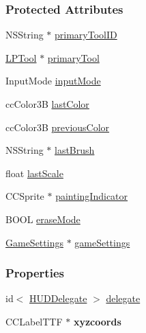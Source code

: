 \subsubsection*{Protected Attributes}
\begin{DoxyCompactItemize}
\item 
N\-S\-String $\ast$ \hyperlink{interface_h_u_d_layer_aae17304a5ecff2a6fa43471edb779341}{primary\-Tool\-I\-D}
\item 
\hyperlink{interface_l_p_tool}{L\-P\-Tool} $\ast$ \hyperlink{interface_h_u_d_layer_aad9b0e2b4164986e18ea0a9afcd1a914}{primary\-Tool}
\item 
Input\-Mode \hyperlink{interface_h_u_d_layer_a1e506792d581032644d75804beb359a7}{input\-Mode}
\item 
cc\-Color3\-B \hyperlink{interface_h_u_d_layer_a2d27bf64876ea6f0b2f0d1b9013c1cd7}{last\-Color}
\item 
cc\-Color3\-B \hyperlink{interface_h_u_d_layer_a2b737d7aa3b728dd3d5990ef4cb68f29}{previous\-Color}
\item 
N\-S\-String $\ast$ \hyperlink{interface_h_u_d_layer_ad7cb8a30419241ee8d2f2813031191be}{last\-Brush}
\item 
float \hyperlink{interface_h_u_d_layer_aedd1d8d2b2d31e203c3242d09390b561}{last\-Scale}
\item 
C\-C\-Sprite $\ast$ \hyperlink{interface_h_u_d_layer_a67d356e56a82f871b6c5de5818c5985d}{painting\-Indicator}
\item 
B\-O\-O\-L \hyperlink{interface_h_u_d_layer_aa1df984387a5f884acf38a7d733d6432}{erase\-Mode}
\item 
\hyperlink{interface_game_settings}{Game\-Settings} $\ast$ \hyperlink{interface_h_u_d_layer_a69515b3bf7bddc07e65bad3eaa4a2e7a}{game\-Settings}
\end{DoxyCompactItemize}
\subsubsection*{Properties}
\begin{DoxyCompactItemize}
\item 
id$<$ \hyperlink{protocol_h_u_d_delegate-p}{H\-U\-D\-Delegate} $>$ \hyperlink{interface_h_u_d_layer_a64cb26c1f8c5a76e8f392a02291c0cf6}{delegate}
\item 
\hypertarget{interface_h_u_d_layer_ae0974aa467c08003e700e3d538f282c0}{C\-C\-Label\-T\-T\-F $\ast$ {\bfseries xyzcoords}}\label{d3/d8a/interface_h_u_d_layer_ae0974aa467c08003e700e3d538f282c0}

\end{DoxyCompactItemize}



